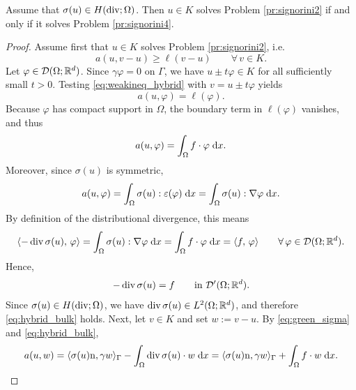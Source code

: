 \begin{proposition}
	Assume that $\sigma(u)\in H(\diver;\Omega)$. Then $u\in K$ solves Problem \ref{pr:signorini2} if and only if it solves Problem \ref{pr:signorini4}.
\end{proposition}
\begin{proof}
	Assume first that $u\in K$ solves Problem \ref{pr:signorini2}, i.e.
	\begin{equation}\label{eq:weakineq_hybrid}
		a(u,v-u)\ge \ell(v-u)\qquad \forall\, v\in K.
	\end{equation}
	Let $\varphi\in\mathcal D(\Omega;{\mathbb R}^d)$. Since $\gamma\varphi=0$ on $\Gamma$, we have $u\pm t\varphi\in K$ for all sufficiently small $t>0$. Testing \eqref{eq:weakineq_hybrid} with $v=u\pm t\varphi$ yields
	\begin{equation*}
		a(u,\varphi)=\ell(\varphi).
	\end{equation*}
	Because $\varphi$ has compact support in $\Omega$, the boundary term in $\ell(\varphi)$ vanishes, and thus
	\begin{equation*}
		a(u,\varphi)=\int_\Omega f\cdot \varphi\;{{\mathrm{d}} x}.
	\end{equation*}
	Moreover, since $\sigma(u)$ is symmetric,
	\begin{equation*}
		a(u,\varphi)=\int_\Omega \sigma(u):\varepsilon(\varphi)\;{{\mathrm{d}} x}
		=\int_\Omega \sigma(u):\nabla\varphi\;{{\mathrm{d}} x}.
	\end{equation*}
	By definition of the distributional divergence, this means
	\begin{equation*}
		\langle-\diver\sigma(u),\,\varphi\rangle
		=
		\int_\Omega \sigma(u):\nabla\varphi\;\dx
		=
		\int_\Omega f\cdot\varphi\;\dx
		=
		\langle f,\,\varphi\rangle
		\qquad \forall\,\varphi\in\mathcal D(\Omega;\R^d).
	\end{equation*}
	Hence,
	\begin{equation*}
		-\diver\sigma(u)=f
		\qquad\text{in }\mathcal D'(\Omega;\R^d).
	\end{equation*}
	Since $\sigma(u)\in H(\diver;\Omega)$, we have $\diver\sigma(u)\in L^2(\Omega;\R^d)$, and therefore \eqref{eq:hybrid_bulk} holds. Next, let $v\in K$ and set $w:=v-u$. By \eqref{eq:green_sigma} and \eqref{eq:hybrid_bulk},
	\begin{equation*}
		a(u,w)
		=
		\langle \sigma(u)\mathrm n,\gamma w\rangle_\Gamma
		-\int_\Omega \diver\sigma(u)\cdot w\;\dx
		=
		\langle \sigma(u)\mathrm n,\gamma w\rangle_\Gamma
		+\int_\Omega f\cdot w\;\dx.
	\end{equation*}

\end{proof}
